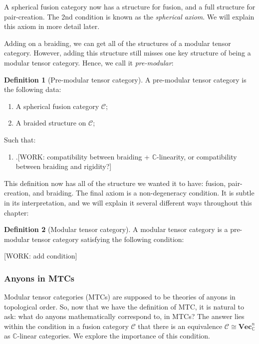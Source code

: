 \documentclass{article}
\theoremstyle{definition}
\newtheorem*{definition}{Definition}
\newcommand{\CC}{\mathbb{C}}
\newcommand{\C}{\mathscr{C}}
\newcommand{\0}{\left|0\right>}
\newcommand{\1}{\left|1\right>}
\renewcommand{\Vec}{\mathbf{Vec}}
\numberwithin{figure}{section}
\begin{document}
A spherical fusion category now has a structure for fusion, and a full structure for pair-creation. The 2nd condition is known as the \textit{spherical axiom}. We will explain this axiom in more detail later.

Adding on a braiding, we can get all of the structures of a modular tensor category. However, adding this structure still misses one key structure of being a modular tensor category. Hence, we call it \textit{pre-modular}:

\begin{definition}[Pre-modular tensor category] A pre-modular tensor category is the following data:

\begin{enumerate}
\item A spherical fusion category $\C$;
\item A braided structure on $\C$;
\end{enumerate}

Such that:

\begin{enumerate}
\item .[WORK: compatibility between braiding + $\CC$-linearity, or compatibility between braiding and rigidity?]
\end{enumerate}

\raggedleft\qedsymbol{}
\end{definition}

This definition now has all of the structure we wanted it to have: fusion, pair-creation, and braiding. The final axiom is a non-degeneracy condition. It is subtle in its interpretation, and we will explain it several different ways throughout this chapter:


\begin{definition}[Modular tensor category] A modular tensor category is a pre-modular tensor category satisfying the following condition:

[WORK: add condition]

\raggedleft\qedsymbol{}
\end{definition}


\subsubsection{Anyons in MTCs}

Modular tensor categories (MTCs) are supposed to be theories of anyons in topological order. So, now that we have the definition of MTC, it is natural to ask: what do anyons mathematically correspond to, in MTCs? The answer lies within the condition in a fusion category $\C$ that there is an equivalence $\C\cong \Vec_\CC^n$ as $\CC$-linear categories. We explore the importance of this condition.
\end{document}
